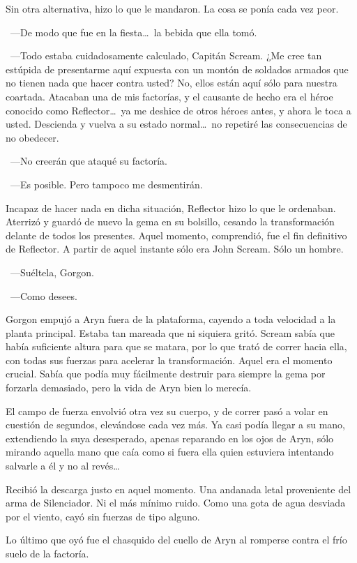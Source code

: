Sin otra alternativa, hizo lo que le mandaron. La cosa se ponía cada vez peor.

~---De modo que fue en la fiesta\dots\ la bebida que ella tomó.

~---Todo estaba cuidadosamente calculado, Capitán Scream. ¿Me cree tan estúpida de presentarme aquí expuesta con un montón de soldados armados que no tienen nada que hacer contra usted? No, ellos están aquí sólo para nuestra coartada. Atacaban una de mis factorías, y el causante de hecho era el héroe conocido como Reflector\dots\ ya me deshice de otros héroes antes, y ahora le toca a usted. Descienda y vuelva a su estado normal\dots\ no repetiré las consecuencias de no obedecer.

~---No creerán que ataqué su factoría.

~---Es posible. Pero tampoco me desmentirán.

Incapaz de hacer nada en dicha situación, Reflector hizo lo que le ordenaban. Aterrizó y guardó de nuevo la gema en su bolsillo, cesando la transformación delante de todos los presentes. Aquel momento, comprendió, fue el fin definitivo de Reflector. A partir de aquel instante sólo era John Scream. Sólo un hombre.

~---Suéltela, Gorgon.

~---Como desees.

Gorgon empujó a Aryn fuera de la plataforma, cayendo a toda velocidad a la planta principal. Estaba tan mareada que ni siquiera gritó. Scream sabía que había suficiente altura para que se matara, por lo que trató de correr hacia ella, con todas sus fuerzas para acelerar la transformación. Aquel era el momento crucial. Sabía que podía muy fácilmente destruir para siempre la gema por forzarla demasiado, pero la vida de Aryn bien lo merecía.

El campo de fuerza envolvió otra vez su cuerpo, y de correr pasó a volar en cuestión de segundos, elevándose cada vez más. Ya casi podía llegar a su mano, extendiendo la suya desesperado, apenas reparando en los ojos de Aryn, sólo mirando aquella mano que caía como si fuera ella quien estuviera intentando salvarle a él y no al revés\dots

Recibió la descarga justo en aquel momento. Una andanada letal proveniente del arma de Silenciador. Ni el más mínimo ruido. Como una gota de agua desviada por el viento, cayó sin fuerzas de tipo alguno.

Lo último que oyó fue el chasquido del cuello de Aryn al romperse contra el frío suelo de la factoría.


